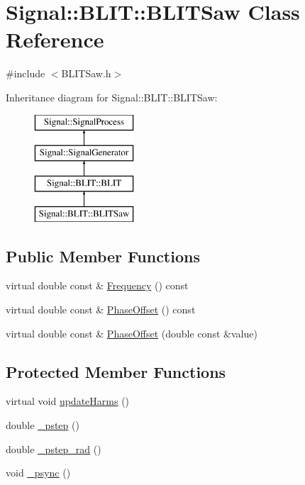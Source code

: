 \hypertarget{class_signal_1_1_b_l_i_t_1_1_b_l_i_t_saw}{\section{Signal\+:\+:B\+L\+I\+T\+:\+:B\+L\+I\+T\+Saw Class Reference}
\label{class_signal_1_1_b_l_i_t_1_1_b_l_i_t_saw}
}


{\ttfamily \#include $<$B\+L\+I\+T\+Saw.\+h$>$}

Inheritance diagram for Signal\+:\+:B\+L\+I\+T\+:\+:B\+L\+I\+T\+Saw\+:\begin{figure}[H]
\begin{center}
\leavevmode
\includegraphics[height=4.000000cm]{class_signal_1_1_b_l_i_t_1_1_b_l_i_t_saw}
\end{center}
\end{figure}
\subsection*{Public Member Functions}
\begin{DoxyCompactItemize}
\item 
virtual double const \& \hyperlink{class_signal_1_1_signal_generator_a96af42ee68f94e9b04d034fd68b73ecd}{Frequency} () const 
\item 
virtual double const \& \hyperlink{class_signal_1_1_signal_generator_ac2538ec946f001e394d2416fda698d1c}{Phase\+Offset} () const 
\item 
virtual double const \& \hyperlink{class_signal_1_1_signal_generator_ac6a103ff72beaa338f6d18c812522d78}{Phase\+Offset} (double const \&value)
\end{DoxyCompactItemize}
\subsection*{Protected Member Functions}
\begin{DoxyCompactItemize}
\item 
virtual void \hyperlink{class_signal_1_1_b_l_i_t_1_1_b_l_i_t_saw_a9c8ad70fca571cc707eaa99649d74afc}{update\+Harms} ()
\item 
double \hyperlink{class_signal_1_1_b_l_i_t_1_1_b_l_i_t_ae552ae6350f291dd14198f88fbda0359}{\+\_\+pstep} ()
\item 
double \hyperlink{class_signal_1_1_b_l_i_t_1_1_b_l_i_t_a09820c226748516af14ff25043f1c51a}{\+\_\+pstep\+\_\+rad} ()
\item 
void \hyperlink{class_signal_1_1_b_l_i_t_1_1_b_l_i_t_ad0ede061ea6ca1db803d16ac8c968875}{\+\_\+psync} ()
\end{DoxyCompactItemize}
